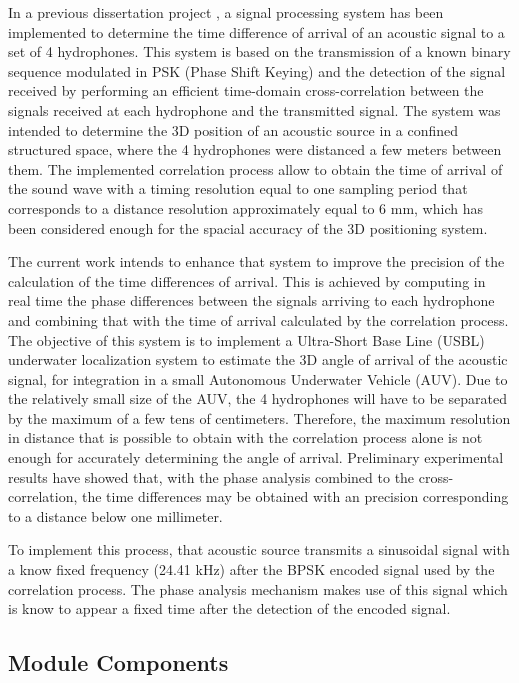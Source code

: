 In a previous dissertation project \cite{afonso-thesis}, a signal processing system has been implemented to determine the time difference of arrival of an acoustic signal to a set of 4 hydrophones. This system is based on the transmission of a known binary sequence modulated in PSK (Phase Shift Keying) and the detection of the signal received by performing an efficient time-domain cross-correlation between the signals received at each hydrophone and the transmitted signal. The system was intended to determine the 3D position of an acoustic source in a confined structured space, where the 4 hydrophones were distanced a few meters between them. The implemented correlation process allow to obtain the time of arrival of the sound wave with a timing resolution equal to one sampling period that corresponds to a distance resolution approximately equal to 6 mm, which has been considered enough for the spacial accuracy of the 3D positioning system.

The current work intends to enhance that system to improve the precision of the calculation of the time differences of arrival. This is achieved by computing in real time the phase differences between the signals arriving to each hydrophone and combining that with the time of arrival calculated by the correlation process. The objective of this system is to implement a Ultra-Short Base Line (USBL) underwater localization system to estimate the 3D angle of arrival of the acoustic signal, for integration in a small Autonomous Underwater Vehicle (AUV). Due to the relatively small size of the AUV, the 4 hydrophones will have to be separated by the maximum of a few tens of centimeters. Therefore, the maximum resolution in distance that is possible to obtain with the correlation process alone is not enough for accurately determining the angle of arrival. Preliminary experimental results have showed that, with the phase analysis combined to the cross-correlation, the time differences may be obtained with an precision corresponding to a distance below one millimeter. 

To implement this process, that acoustic source transmits a sinusoidal signal with a know fixed frequency (24.41 kHz) after the BPSK encoded signal used by the correlation process. The phase analysis mechanism makes use of this signal which is know to appear a fixed time after the detection of the encoded signal.

\subsection{Module Components}

